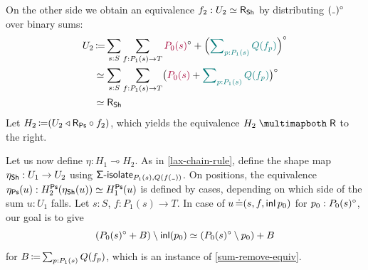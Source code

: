 \begin{problem}[note={Lax chain rule for two-parameter containers}]
\begin{construction}
    On the other side we obtain an equivalence \( f_2 : U_2 \simeq {\mathsf{R}}_{\operatorname{\mathsf{Sh}}} \)
    by distributing \( \Isolated{(\Blank)} \) over binary sums:
    \begin{align*}
      U_2
      &\DefEq
      \sum_{s : S} \sum_{f : P_1(s) \to T}
        \Isolated{\Highlight{P_0(s)}} + \Isolated{\Bigl( \HighlightAlt{ \sum\nolimits_{p : P_1(s)} Q(f_p) } \Bigr)}
        \\
      &\simeq
      \sum_{s : S} \sum_{f : P_1(s) \to T}
        \Isolated{\bigl( \Highlight{P_0(s)} + \HighlightAlt{ \sum\nolimits_{p : {P_1(s)}} Q(f_p) } \bigr)}
        \\
      &\simeq
        {\R}_{\Sh}
    \end{align*}
    Let \( H_2 \operatorname{\mathrel{\coloneq}} (U_2\mathbin{\triangleleft}{\mathsf{R}}_{\operatorname{\mathsf{Ps}}} \circ f_2) \),
    which yields the equivalence \( \CartIso{H_2}{\R} \) to the right.

    Let us now define \( \eta : H_1 \multimap H_2 \).
    As in \autoref{lax-chain-rule}, define the shape map \( \eta_{\operatorname{\mathsf{Sh}}} : U_1 \to U_2 \) using \( \SigmaIsolate_{P_1(s),Q(f(\Blank))} \).
    On positions, the equivalence
    \(
      \eta_{\operatorname{\mathsf{Ps}}}(u) : H_2^{\operatorname{\mathsf{Ps}}}(\eta_{\operatorname{\mathsf{Sh}}}(u)) \simeq H_1^{\operatorname{\mathsf{Ps}}}(u)
    \)
    is defined by cases, depending on which side of the sum \( u : U_1 \) falls.
    Let \( s : S \), \( f : P_1(s) \to T \).
    In case of \( u \operatorname{\mathrel{\doteq}} (s, f, \operatorname{\mathsf{inl}}{p_0}) \) for \( p_0 : P_0(s)^{\circ} \), our goal is to give
    \[
      ( P_0(s)^{\circ} + B ) \setminus \operatorname{\mathsf{inl}}(p_0)
        \simeq
      ( P_0(s)^{\circ} \setminus p_0 ) + B
    \]
    for \( B \operatorname{\mathrel{\coloneq}} {\textstyle \sum_{p : P_1(s)} Q(f_p) } \), which is an instance of \autoref{sum-remove-equiv}.


\end{construction}
\end{problem}

